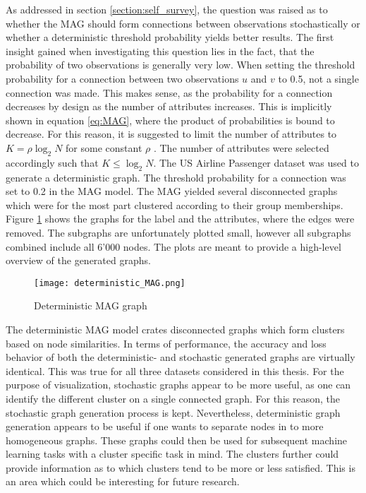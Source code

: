   As addressed in section \ref{section:self_survey}, the question was raised 
  as to whether the MAG should form connections between observations
  stochastically or whether a deterministic threshold probability yields better 
  results. The first insight gained when investigating this question lies in 
  the fact, that the probability of two observations is generally very low. 
  When setting the threshold probability for a connection between two 
  observations $u$ and $v$ to 0.5, not a single connection was made. This makes 
  sense, as the probability for a connection decreases by design as the number 
  of attributes increases. This is implicitly shown in equation \ref{eq:MAG}, 
  where the product of probabilities is bound to decrease. For this reason, it 
  is suggested to limit the number of attributes to $K=\rho\log_{2}N$ for some 
  constant $\rho$ \citep[p. 122]{kim2012multiplicative}. The number of 
  attributes were selected accordingly such that $K\leqslant\log_{2} N$. The 
  US Airline Passenger dataset was used to generate a deterministic graph. The 
  threshold probability for a connection was set to 0.2 in the MAG model. The 
  MAG yielded several disconnected graphs which were for the most part 
  clustered according to their group memberships. Figure \ref{fig:det_MAG} 
  shows the graphs for the label and the attributes, where the edges were 
  removed. The subgraphs are unfortunately plotted small, however all subgraphs 
  combined include all 6'000 nodes. The plots are meant to provide a high-level 
  overview of the generated graphs. 

  \begin{figure}[h]
		\centering
		\texttt{[image: deterministic\_MAG.png]}
		\caption{Deterministic MAG graph}
        \label{fig:det_MAG}
  \end{figure}

  \noindent The deterministic MAG model crates disconnected graphs which form 
  clusters based on node similarities. In terms of performance, the accuracy 
  and loss behavior of both the deterministic- and stochastic generated graphs 
  are virtually identical. This was true for all three datasets considered in 
  this thesis. For the purpose of visualization, stochastic graphs appear
  to be more useful, as one can identify the different cluster on a single
  connected graph. For this reason, the stochastic graph generation process is 
  kept. Nevertheless, deterministic graph generation appears to be useful if 
  one wants to separate nodes in to more homogeneous graphs. These 
  graphs could then be used for subsequent machine learning tasks with a cluster 
  specific task in mind. The clusters further could provide information as to 
  which clusters tend to be more or less satisfied. This is an area which could 
  be interesting for future research.
  
